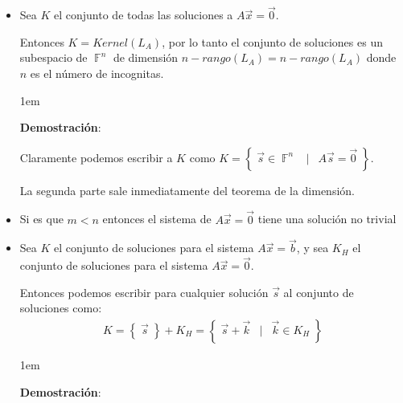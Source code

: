 \documentclass[12pt, fleqn]{report}                             %
\newenvironment{SmallIndentation}[1][0.75em]                    %
        {\begin{adjustwidth}{#1}{}\begin{footnotesize}}             %
        {\end{footnotesize}\end{adjustwidth}}                       %
\DeclareMathOperator \Space {\quad}                             %
\DeclareMathOperator \MiniSpace {\;}                            %
\newcommand \Such {\MiniSpace | \MiniSpace}                     %
\theoremstyle{break}                                            %
\DeclareMathOperator \GenericField {\mathbb{F}}                 %
\newcommand{\Set}[1]    {\left\{ \; #1 \; \right\}}             %
\begin{document}
                    \begin{itemize}
                        \item 
                            Sea $K$ el conjunto de todas las soluciones a $A \vec x = \vec 0$.

                            Entonces $K = Kernel(L_A)$, por lo tanto el conjunto de soluciones es un subespacio
                            de $\GenericField^n$ de dimensión $n - rango(L_A) = n - rango(L_A)$ donde $n$ es el 
                            número de incognitas.

                            \begin{SmallIndentation}[1em]
                                \textbf{Demostración}:
                                
                                Claramente podemos escribir a $K$ como $K = \Set{\vec s \in \GenericField^n \Such A \vec s = \vec 0}$.

                                La segunda parte sale inmediatamente del teorema de la dimensión.
                            
                            \end{SmallIndentation}

                        \item
                            Si es que $m < n$ entonces el sistema de $A \vec x = \vec 0$ tiene una solución no trivial

                        \item
                            Sea $K$ el conjunto de soluciones para el sistema $A \vec x = \vec b$, y sea
                            $K_H$ el conjunto de soluciones para el sistema $A \vec x = \vec 0$.

                            Entonces podemos escribir para cualquier solución $\vec s$ al conjunto de soluciones
                            como:
                            \begin{align*}
                                K = \Set{\vec s} + K_H
                                  = \Set{\vec s + \vec k \Such \vec k \in K_H}
                            \end{align*}

                            \begin{SmallIndentation}[1em]
                                \textbf{Demostración}:
                                

\end{SmallIndentation}
\end{itemize}
\end{document}
